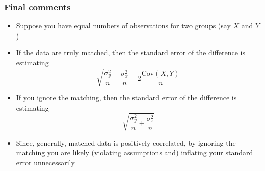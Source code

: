 \documentclass[aspectratio=169]{beamer}
\newcommand{\Cov}{\mathrm{Cov}}
\begin{document}
\begin{frame}\frametitle{Final comments}
  \begin{itemize}
    \item Suppose you have equal numbers of observations for two groups (say $X$ and $Y$)
    \item If the data are truly matched, then the standard error of the
      difference is estimating
      $$
      \sqrt{\frac{\sigma_y^2}{n} + \frac{\sigma_x^2}{n} - 2 \frac{\Cov(X, Y)}{n}}
      $$
    \item If you ignore the matching, then the standard
      error of the difference is estimating
      $$
      \sqrt{\frac{\sigma_y^2}{n} + \frac{\sigma_x^2}{n}}
      $$
    \item Since, generally, matched data is positively correlated, by
      ignoring the matching you are likely (violating assumptions and)
      inflating your standard error unnecessarily
  \end{itemize}
  
\end{frame}
\end{document}
